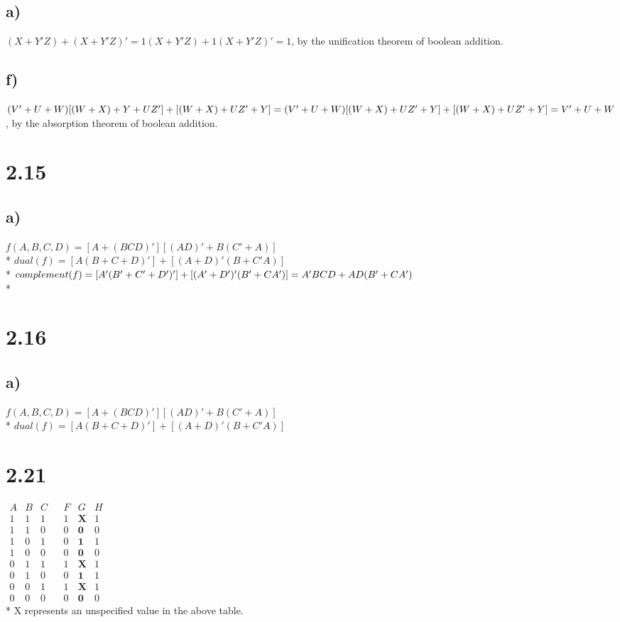 \documentclass{article}
\begin{document}
\subsection{a)}
$(X + Y'Z) + (X + Y'Z)' = 1(X + Y'Z) + 1(X + Y'Z)' = 1$,
by the unification theorem of boolean addition.
\subsection{f)}
$(V' + U + W) [(W + X) + Y + UZ'] + [(W + X) + UZ' + Y]
\\*
= (V' + U + W) [(W + X) + UZ' + Y] + [(W + X) + UZ' + Y]
\\*
= V' + U + W
$,
by the absorption theorem of boolean addition.

\section{2.15}
\subsection{a)}
$f(A, B, C, D) = [A + (BCD)'][(AD)' + B(C' + A)]$
\\*
$dual(f)
= [A(B + C + D)'] + [(A + D)'(B + C'A)]$
\\*
$complement(f)
= [A'(B' + C' + D')'] + [(A' + D')'(B' + CA')]
\\*
= A'BCD + AD(B' + CA')$
\\*


\section{2.16}
\subsection{a)}
$f(A, B, C, D) = [A + (BCD)'][(AD)' + B(C' + A)]$
\\*
$dual(f)
= [A(B + C + D)'] + [(A + D)'(B + C'A)]$

\section{2.21}
$
\begin{array}{ccc|cccc}
A&B&C&&F&G&H
\\\hline
1&1&1&&1&\mathbf{X}&1\\
1&1&0&&0&\mathbf{0}&0\\
1&0&1&&0&\mathbf{1}&1\\
1&0&0&&0&\mathbf{0}&0\\
0&1&1&&1&\mathbf{X}&1\\
0&1&0&&0&\mathbf{1}&1\\
0&0&1&&1&\mathbf{X}&1\\
0&0&0&&0&\mathbf{0}&0
\end{array}
$
\\*
X represents an unspecified value in the above table.
\end{document}
